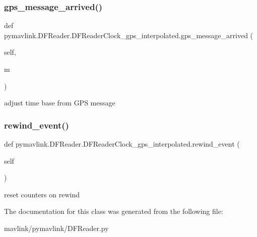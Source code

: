 \subsubsection{\texorpdfstring{gps\+\_\+message\+\_\+arrived()}{gps\_message\_arrived()}}
{\footnotesize\ttfamily def pymavlink.\+D\+F\+Reader.\+D\+F\+Reader\+Clock\+\_\+gps\+\_\+interpolated.\+gps\+\_\+message\+\_\+arrived (\begin{DoxyParamCaption}\item[{}]{self,  }\item[{}]{m }\end{DoxyParamCaption})}

\begin{DoxyVerb}adjust time base from GPS message\end{DoxyVerb}
 \mbox{\label{classpymavlink_1_1DFReader_1_1DFReaderClock__gps__interpolated_a17d0356947948b2bbeb7a47531515c72}} 
\subsubsection{\texorpdfstring{rewind\+\_\+event()}{rewind\_event()}}
{\footnotesize\ttfamily def pymavlink.\+D\+F\+Reader.\+D\+F\+Reader\+Clock\+\_\+gps\+\_\+interpolated.\+rewind\+\_\+event (\begin{DoxyParamCaption}\item[{}]{self }\end{DoxyParamCaption})}

\begin{DoxyVerb}reset counters on rewind\end{DoxyVerb}
 

The documentation for this class was generated from the following file\+:\begin{DoxyCompactItemize}
\item 
mavlink/pymavlink/D\+F\+Reader.\+py\end{DoxyCompactItemize}
